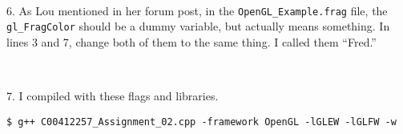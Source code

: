 \

6.  As Lou mentioned in her forum post, in the {\tt OpenGL\_Example.frag} file, the {\tt gl\_FragColor} should be a dummy variable, but actually means something.  In lines 3 and 7, change both of them to the same thing.  I called them ``Fred.''

\

7.  I compiled with these flags and libraries.  

\begin{verbatim}
$ g++ C00412257_Assignment_02.cpp -framework OpenGL -lGLEW -lGLFW -w
\end{verbatim}

